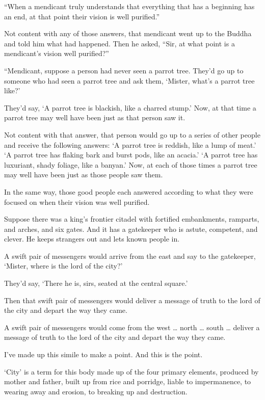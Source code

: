 \documentclass[12pt,openany]{book}%
\begin{document}
“When a mendicant truly understands that everything that has a beginning has an end, at that point their vision is well purified.” 

Not content with any of those answers, that mendicant went up to the Buddha and told him what had happened. Then he asked, “Sir, at what point is a mendicant’s vision well purified?” 

“Mendicant, suppose a person had never seen a parrot tree. They’d go up to someone who had seen a parrot tree and ask them, ‘Mister, what’s a parrot tree like?’ 

They’d say, ‘A parrot tree is blackish, like a charred stump.’ Now, at that time a parrot tree may well have been just as that person saw it. 

Not content with that answer, that person would go up to a series of other people and receive the following answers: ‘A parrot tree is reddish, like a lump of meat.’ ‘A parrot tree has flaking bark and burst pods, like an acacia.’ ‘A parrot tree has luxuriant, shady foliage, like a banyan.’ Now, at each of those times a parrot tree may well have been just as those people saw them. 

In the same way, those good people each answered according to what they were focused on when their vision was well purified. 

Suppose there was a king’s frontier citadel with fortified embankments, ramparts, and arches, and six gates. And it has a gatekeeper who is astute, competent, and clever. He keeps strangers out and lets known people in. 

A swift pair of messengers would arrive from the east and say to the gatekeeper, ‘Mister, where is the lord of the city?’ 

They’d say, ‘There he is, sirs, seated at the central square.’ 

Then that swift pair of messengers would deliver a message of truth to the lord of the city and depart the way they came. 

A swift pair of messengers would come from the west … north … south … deliver a message of truth to the lord of the city and depart the way they came. 

I’ve made up this simile to make a point. And this is the point. 

‘City’ is a term for this body made up of the four primary elements, produced by mother and father, built up from rice and porridge, liable to impermanence, to wearing away and erosion, to breaking up and destruction. 
\end{document}
